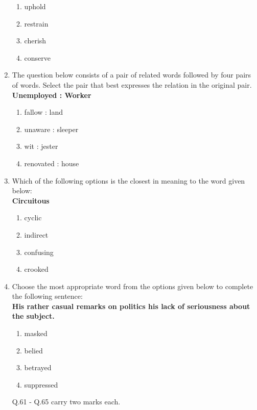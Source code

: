 \documentclass[journal]{IEEEtran}
\begin{document}
\begin{enumerate}
    \begin{enumerate}
        \item uphold
        \item restrain
        \item cherish
        \item conserve
    \end{enumerate}
    \item The question below consists of a pair of related words followed by four pairs of words. Select the pair that best expresses the relation in the original pair.\\ \textbf{Unemployed : Worker}
    \begin{enumerate}
        \item fallow : land
        \item unaware : sleeper
        \item wit : jester
        \item renovated : house
    \end{enumerate}
    \item Which of the following options is the closest in meaning to the word given below:\\ \textbf{Circuitous}
    \begin{enumerate}
        \item cyclic
        \item indirect
        \item confusing
        \item crooked
    \end{enumerate}
    \item Choose the most appropriate word from the options given below to complete the following sentence:\\ \textbf{His rather casual remarks on politics \underline{\hspace{2cm}} his lack of seriousness about the subject.} 
    \begin{enumerate}
        \item masked
        \item belied
        \item betrayed
        \item suppressed
    \end{enumerate}
    Q.61 - Q.65 carry two marks each.\\
    

\end{enumerate}
\end{document}
